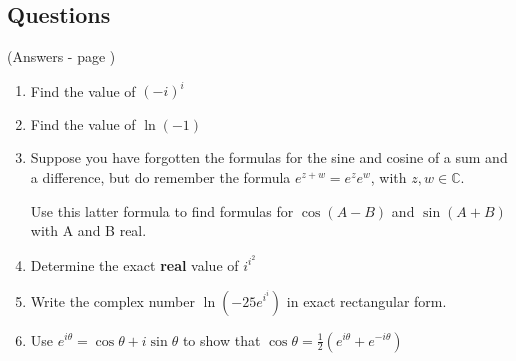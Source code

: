 \documentclass[../main.tex]{subfiles}
\begin{document}
\subsection*{Questions}
(Answers - page \pageref*{Eulers answers})
\label{eulersformula}
\begin{enumerate}
    \item 
    Find the value of \((-i)^i\)

    \item 
    Find the value of \(\ln{(-1)}\)

    \item 
    Suppose you have forgotten the formulas for the sine and cosine of a sum and a difference, but do remember the formula \(e^{z+w}=e^z e^w\), with \(z, w \in \mathbb{C} \).

    Use this latter formula to find formulas for \(\cos{(A-B)}\) and \(\sin{(A+B)}\) with A and B real.

    \item 
    Determine the exact \textbf{real} value of \(i^{i^{2}}\)

    \item 
    Write the complex number \(\ln{(-25e^{i^{i}})}\) in exact rectangular form.

    \item 
    Use \(e^{i\theta}=\cos{\theta}+i\sin{\theta}\) to show that \(\cos{\theta}=\frac{1}{2}(e^{i\theta}+e^{-i\theta})\)
    
\end{enumerate}
\end{document}
